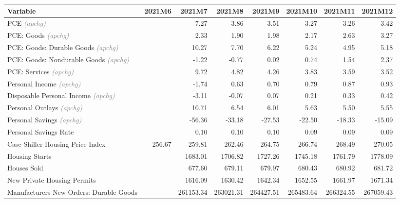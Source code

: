 \documentclass[11pt, letterpaper]{article}\usepackage[]{graphicx}\usepackage[]{color}
\begin{document}
\begin{table}[H]
\centering
\begingroup\fontsize{10pt}{12pt}\selectfont
\begin{tabular}{lrrrrrrr}
  \hline
Variable & 2021M6 & 2021M7 & 2021M8 & 2021M9 & 2021M10 & 2021M11 & 2021M12 \\ 
  \hline
PCE \textit{\footnotesize\textcolor{gray}{(apchg)}} &  & 7.27 & 3.86 & 3.51 & 3.27 & 3.26 & 3.42 \\ 
  PCE: Goods \textit{\footnotesize\textcolor{gray}{(apchg)}} &  & 2.33 & 1.90 & 1.98 & 2.17 & 2.63 & 3.27 \\ 
  PCE: Goods: Durable Goods \textit{\footnotesize\textcolor{gray}{(apchg)}} &  & 10.27 & 7.70 & 6.22 & 5.24 & 4.95 & 5.18 \\ 
  PCE: Goods: Nondurable Goods \textit{\footnotesize\textcolor{gray}{(apchg)}} &  & -1.22 & -0.77 & 0.02 & 0.74 & 1.54 & 2.37 \\ 
  PCE: Services \textit{\footnotesize\textcolor{gray}{(apchg)}} &  & 9.72 & 4.82 & 4.26 & 3.83 & 3.59 & 3.52 \\ 
  Personal Income \textit{\footnotesize\textcolor{gray}{(apchg)}} &  & -1.74 & 0.63 & 0.70 & 0.79 & 0.87 & 0.93 \\ 
  Disposable Personal Income \textit{\footnotesize\textcolor{gray}{(apchg)}} &  & -3.11 & -0.07 & 0.07 & 0.21 & 0.33 & 0.42 \\ 
  Personal Outlays \textit{\footnotesize\textcolor{gray}{(apchg)}} &  & 10.71 & 6.54 & 6.01 & 5.63 & 5.50 & 5.55 \\ 
  Personal Savings \textit{\footnotesize\textcolor{gray}{(apchg)}} &  & -56.36 & -33.18 & -27.53 & -22.50 & -18.33 & -15.09 \\ 
  Personal Savings Rate &  & 0.10 & 0.10 & 0.10 & 0.09 & 0.09 & 0.09 \\ 
  Case-Shiller Housing Price Index & 256.67 & 259.81 & 262.46 & 264.75 & 266.74 & 268.49 & 270.05 \\ 
  Housing Starts &  & 1683.01 & 1706.82 & 1727.26 & 1745.18 & 1761.79 & 1778.09 \\ 
  Houses Sold &  & 677.60 & 679.11 & 679.97 & 680.43 & 680.92 & 681.72 \\ 
  New Private Housing Permits &  & 1616.09 & 1630.42 & 1642.34 & 1652.55 & 1661.97 & 1671.34 \\ 
  Manufacturers New Orders: Durable Goods &  & 261153.34 & 263021.31 & 264427.51 & 265483.64 & 266324.55 & 267059.43 \\ 

\end{tabular}
\end{table}
\end{document}
